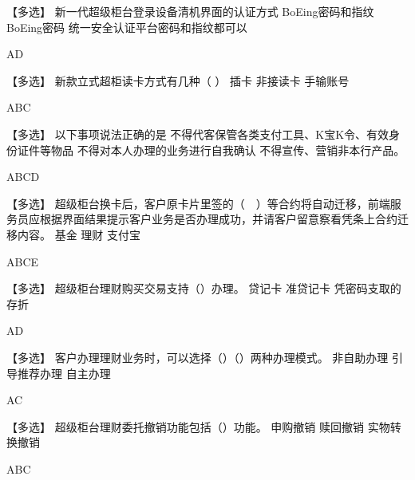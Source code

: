 \documentclass[kindlepaper]{BHCexam4kindle}
\begin{document}
\begin{questions}
\qs 【多选】 新一代超级柜台登录设备清机界面的认证方式 \xx
{} {  BoEing密码和指纹 } { BoEing密码 } { 统一安全认证平台密码和指纹都可以 }
\begin{solution} AD \end{solution}
\qs 【多选】 新款立式超柜读卡方式有几种（ ） \xx
{} {  插卡 } { 非接读卡 } { 手输账号 }
\begin{solution} ABC \end{solution}
\qs 【多选】 以下事项说法正确的是 \xx
{} {  不得代客保管各类支付工具、K宝K令、有效身份证件等物品 } { 不得对本人办理的业务进行自我确认 } { 不得宣传、营销非本行产品。 }
\begin{solution} ABCD \end{solution}
\qs 【多选】 超级柜台换卡后，客户原卡片里签的（　）等合约将自动迁移，前端服务员应根据界面结果提示客户业务是否办理成功，并请客户留意察看凭条上合约迁移内容。 \xx
{} {  基金 } { 理财 } { 支付宝 }
\begin{solution} ABCE \end{solution}
\qs 【多选】 超级柜台理财购买交易支持（）办理。 \xx
{} {  贷记卡 } { 准贷记卡 } { 凭密码支取的存折 }
\begin{solution} AD \end{solution}
\qs 【多选】 客户办理理财业务时，可以选择（）（）两种办理模式。 \xx
{} {  非自助办理 } { 引导推荐办理 } { 自主办理 }
\begin{solution} AC \end{solution}
\qs 【多选】 超级柜台理财委托撤销功能包括（）功能。 \xx
{} {  申购撤销 } { 赎回撤销 } { 实物转换撤销 }
\begin{solution} ABC \end{solution}

\end{questions}
\end{document}
